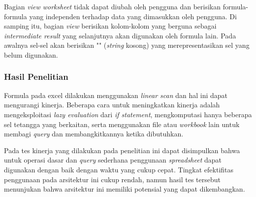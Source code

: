Bagian \textit{view worksheet} tidak dapat diubah oleh pengguna dan berisikan formula-formula yang independen terhadap data yang dimasukkan oleh pengguna. Di samping itu, bagian \textit{view} berisikan kolom-kolom yang berguna sebagai \textit{intermediate result} yang selanjutnya akan digunakan oleh formula lain. Pada awalnya sel-sel akan berisikan "" (\textit{string} kosong) yang merepresentasikan sel yang belum digunakan.

\subsubsection{Hasil Penelitian}

Formula pada excel dilakukan menggunakan \textit{linear scan} dan hal ini dapat mengurangi kinerja. Beberapa cara untuk meningkatkan kinerja adalah mengeksploitasi \textit{lazy evaluation} dari \textit{if statement}, mengkomputasi hanya beberapa sel tetangga yang berkaitan, serta menggunakan file atau \textit{workbook} lain untuk membagi \textit{query} dan membangkitkannya ketika dibutuhkan.

Pada tes kinerja yang dilakukan pada penelitian ini dapat disimpulkan bahwa untuk operasi dasar dan \textit{query} sederhana penggunaan \textit{spreadsheet} dapat digunakan dengan baik dengan waktu yang cukup cepat. Tingkat efektifitas penggunaan pada arsitektur ini cukup rendah, namun hasil tes tersebut menunjukan bahwa arsitektur ini memiliki potensial yang dapat dikembangkan.
